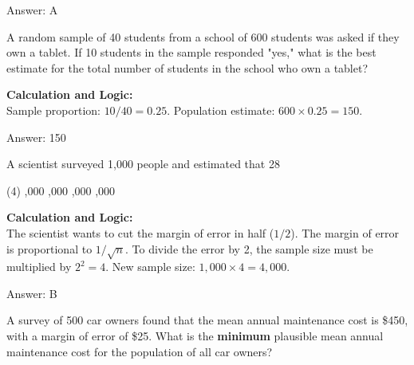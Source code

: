 \documentclass[11pt,paper=a4,answers]{exam}
\begin{document}
\begin{questions}
\begin{solution}
\vspace{30pt}

Answer: \colorbox{yellow!100}{A}
\end{solution}

\vspace{60pt}

\question
A random sample of 40 students from a school of 600 students was asked if they own a tablet. If 10 students in the sample responded "yes," what is the best estimate for the total number of students in the school who own a tablet?

\begin{solution}
\textbf{Calculation and Logic:} \\
Sample proportion: $10 / 40 = 0.25$. Population estimate: $600 \times 0.25 = 150$.

\vspace{30pt}

Answer: \colorbox{yellow!100}{150}
\end{solution}

\vspace{60pt}

\question
A scientist surveyed 1,000 people and estimated that 28%
\begin{tasks}(4)
    ,000
    ,000
    ,000
    ,000
\end{tasks}

\begin{solution}
\textbf{Calculation and Logic:} \\
The scientist wants to cut the margin of error in half ($1/2$). The margin of error is proportional to $1/\sqrt{n}$. To divide the error by 2, the sample size must be multiplied by $2^2 = 4$. New sample size: $1,000 \times 4 = 4,000$.

\vspace{30pt}

Answer: \colorbox{yellow!100}{B}
\end{solution}

\vspace{60pt}

\question
A survey of 500 car owners found that the mean annual maintenance cost is \$450, with a margin of error of \$25. What is the \textbf{minimum} plausible mean annual maintenance cost for the population of all car owners?


\end{questions}
\end{document}
